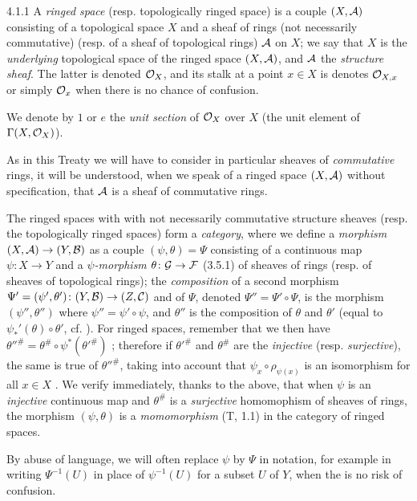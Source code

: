 
\begin{env}{4.1.1}
\label{env-0.4.1.1}
A \emph{ringed space} (resp. topologically ringed space) is a couple $(X,\mathcal{A})$
consisting of a topological space $X$ and a sheaf of rings (not necessarily commutative)
(resp. of a sheaf of topological rings) $\mathcal{A}$ on $X$; we say that $X$ is the
\emph{underlying} topological space of the ringed space $(X,\mathcal{A})$, and $\mathcal{A}$
the \emph{structure sheaf}. The latter is denoted $\mathcal{O}_X$, and its stalk at a point
$x\in X$ is denotes $\mathcal{O}_{X,x}$ or simply $\mathcal{O}_x$ when there is no chance of confusion.

We denote by $1$ or $e$ the \emph{unit section} of $\mathcal{O}_X$ over $X$ (the unit element
of $\Gamma(X,\mathcal{O}_X)$).

As in this Treaty we will have to consider in particular sheaves of \emph{commutative}
rings, it will be understood, when we speak of a ringed space $(X,\mathcal{A})$ without
specification, that $\mathcal{A}$ is a sheaf of commutative rings.

The ringed spaces with with not necessarily commutative structure sheaves
(resp. the topologically ringed spaces) form a \emph{category}, where we define
a \emph{morphism} $(X,\mathcal{A})\to(Y,\mathcal{B})$ as a couple $(\psi,\theta)=\Psi$
consisting of a continuous map $\psi\colon X\to Y$ and a \emph{$\psi$-morphism}
$\theta\colon\mathcal{G}\to\mathcal{F}$ (3.5.1) of sheaves of rings (resp. of sheaves of
topological rings); the \emph{composition} of a second morphism
$\Psi'=(\psi',\theta')\colon(Y,\mathcal{B})\to(Z,\mathcal{C})$ and of $\Psi$, denoted
$\Psi''=\Psi'\circ\Psi$, is the morphism $(\psi'',\theta'')$ where $\psi''=\psi'\circ\psi$,
and $\theta''$ is the composition of $\theta$ and $\theta'$ (equal to
$\psi_\ast'(\theta)\circ\theta'$, cf. ). For ringed spaces, remember that we
then have ${\theta''}^\#=\theta^\#\circ\psi^\ast({\theta'}^\#)$ ; therefore
if ${\theta'}^\#$ and $\theta^\#$ are the \emph{injective} (resp. \emph{surjective}),
the same is true of ${\theta''}^\#$, taking into account that $\psi_x\circ\rho_{\psi(x)}$
is an isomorphism for all $x\in X$ . We verify immediately, thanks to the
above, that when $\psi$ is an \emph{injective} continuous map and $\theta^\#$ is
a \emph{surjective} homomophism of sheaves of rings, the morphism $(\psi,\theta)$ is
a \emph{momomorphism} (T, 1.1) in the category of ringed spaces.

By abuse of language, we will often replace $\psi$ by $\Psi$ in notation, for
example in writing $\Psi^{-1}(U)$ in place of $\psi^{-1}(U)$ for a subset $U$ of $Y$,
when the is no risk of confusion.
\end{env}

